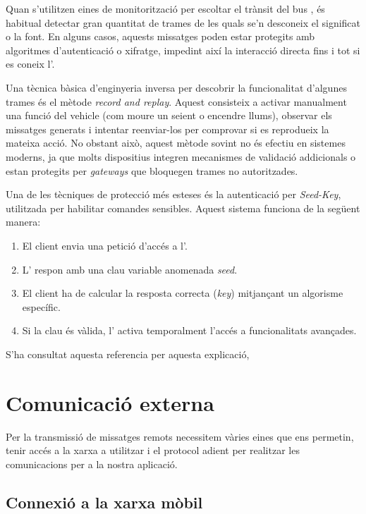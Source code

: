\documentclass{tfgitic}[2024/07/01]
\begin{document}
Quan s'utilitzen eines de monitorització per escoltar el trànsit del bus , és habitual detectar gran quantitat de trames de les quals se'n desconeix el 
significat o la font. En alguns casos, aquests missatges poden estar protegits amb algoritmes d'autenticació o xifratge, impedint així la interacció directa 
fins i tot si es coneix l'.

Una tècnica bàsica d'enginyeria inversa per descobrir la funcionalitat d'algunes trames és el mètode \textit{record and replay}. Aquest consisteix a activar manualment una 
funció del vehicle (com moure un seient o encendre llums), observar els missatges generats i intentar reenviar-los per comprovar si es reprodueix la mateixa acció. 
No obstant això, aquest mètode sovint no és efectiu en sistemes moderns, ja que molts dispositius integren mecanismes de validació addicionals o estan protegits per 
\textit{gateways} que bloquegen trames no autoritzades.

Una de les tècniques de protecció més esteses és la autenticació per \textit{Seed-Key}, utilitzada per habilitar comandes sensibles. Aquest sistema funciona de la següent manera:

\begin{enumerate}
    \item El client envia una petició d'accés a l'.
    \item L' respon amb una clau variable anomenada \textit{seed}.
    \item El client ha de calcular la resposta correcta (\textit{key}) mitjançant un algorisme específic.
    \item Si la clau és vàlida, l' activa temporalment l'accés a funcionalitats avançades.
\end{enumerate}

S'ha consultat aquesta referencia \cite{openeecu_seedkey} per aquesta explicació,

\chapter{Comunicació externa}

Per la transmissió de missatges remots necessitem vàries eines que ens permetin, tenir accés a la xarxa a utilitzar i el protocol adient per realitzar les 
comunicacions per a la nostra aplicació.

\section{Connexió a la xarxa mòbil}
\end{document}
